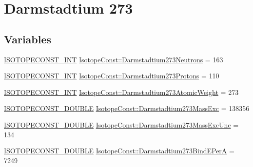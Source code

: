 \hypertarget{group___isotope_const-_darmstadtium-_ds273}{}\section{Darmstadtium 273}
\label{group___isotope_const-_darmstadtium-_ds273}
\subsection*{Variables}
\begin{DoxyCompactItemize}
\item 
\mbox{\hyperlink{group___isotope_const-_macros_ga5f18360b3e99483a35c32d789e62621c}{I\+S\+O\+T\+O\+P\+E\+C\+O\+N\+S\+T\+\_\+\+I\+NT}} \mbox{\hyperlink{group___isotope_const-_darmstadtium-_ds273_ga471047efd43b57a1aa60efdd88d96403}{Isotope\+Const\+::\+Darmstadtium273\+Neutrons}} = 163
\item 
\mbox{\hyperlink{group___isotope_const-_macros_ga5f18360b3e99483a35c32d789e62621c}{I\+S\+O\+T\+O\+P\+E\+C\+O\+N\+S\+T\+\_\+\+I\+NT}} \mbox{\hyperlink{group___isotope_const-_darmstadtium-_ds273_ga14cd94d6518ea093d49a697b1265bbdd}{Isotope\+Const\+::\+Darmstadtium273\+Protons}} = 110
\item 
\mbox{\hyperlink{group___isotope_const-_macros_ga5f18360b3e99483a35c32d789e62621c}{I\+S\+O\+T\+O\+P\+E\+C\+O\+N\+S\+T\+\_\+\+I\+NT}} \mbox{\hyperlink{group___isotope_const-_darmstadtium-_ds273_ga0485f579b89f95d918ed355fde5efcf4}{Isotope\+Const\+::\+Darmstadtium273\+Atomic\+Weight}} = 273
\item 
\mbox{\hyperlink{group___isotope_const-_macros_ga8f45a7272ce02c0b4c65c44636ed719a}{I\+S\+O\+T\+O\+P\+E\+C\+O\+N\+S\+T\+\_\+\+D\+O\+U\+B\+LE}} \mbox{\hyperlink{group___isotope_const-_darmstadtium-_ds273_ga33826e95b1862851453114c20cb74df9}{Isotope\+Const\+::\+Darmstadtium273\+Mass\+Exc}} = 138356
\item 
\mbox{\hyperlink{group___isotope_const-_macros_ga8f45a7272ce02c0b4c65c44636ed719a}{I\+S\+O\+T\+O\+P\+E\+C\+O\+N\+S\+T\+\_\+\+D\+O\+U\+B\+LE}} \mbox{\hyperlink{group___isotope_const-_darmstadtium-_ds273_ga850c7d3c9cdd6567a598bb1996812603}{Isotope\+Const\+::\+Darmstadtium273\+Mass\+Exc\+Unc}} = 134
\item 
\mbox{\hyperlink{group___isotope_const-_macros_ga8f45a7272ce02c0b4c65c44636ed719a}{I\+S\+O\+T\+O\+P\+E\+C\+O\+N\+S\+T\+\_\+\+D\+O\+U\+B\+LE}} \mbox{\hyperlink{group___isotope_const-_darmstadtium-_ds273_ga91c34b2af328f75aff246d3143454028}{Isotope\+Const\+::\+Darmstadtium273\+Bind\+E\+PerA}} = 7249

\end{DoxyCompactItemize}
